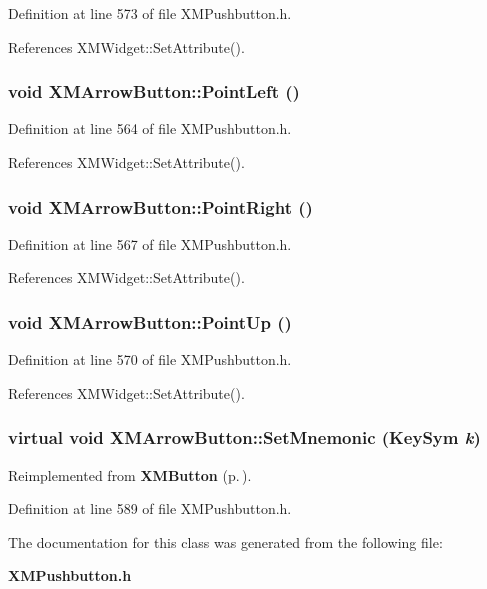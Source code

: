 Definition at line 573 of file XMPushbutton.h.

References XMWidget::Set\-Attribute().
\subsubsection{\setlength{\rightskip}{0pt plus 5cm}void XMArrow\-Button::Point\-Left ()\hspace{0.3cm}{\tt  [inline]}}\label{classXMArrowButton_a3}




Definition at line 564 of file XMPushbutton.h.

References XMWidget::Set\-Attribute().
\subsubsection{\setlength{\rightskip}{0pt plus 5cm}void XMArrow\-Button::Point\-Right ()\hspace{0.3cm}{\tt  [inline]}}\label{classXMArrowButton_a4}




Definition at line 567 of file XMPushbutton.h.

References XMWidget::Set\-Attribute().
\subsubsection{\setlength{\rightskip}{0pt plus 5cm}void XMArrow\-Button::Point\-Up ()\hspace{0.3cm}{\tt  [inline]}}\label{classXMArrowButton_a5}




Definition at line 570 of file XMPushbutton.h.

References XMWidget::Set\-Attribute().
\subsubsection{\setlength{\rightskip}{0pt plus 5cm}virtual void XMArrow\-Button::Set\-Mnemonic (Key\-Sym {\em k})\hspace{0.3cm}{\tt  [inline, virtual]}}\label{classXMArrowButton_a10}




Reimplemented from {\bf XMButton} {\rm (p.\,\pageref{classXMButton_a4})}.

Definition at line 589 of file XMPushbutton.h.

The documentation for this class was generated from the following file:\begin{CompactItemize}
\item 
{\bf XMPushbutton.h}\end{CompactItemize}

